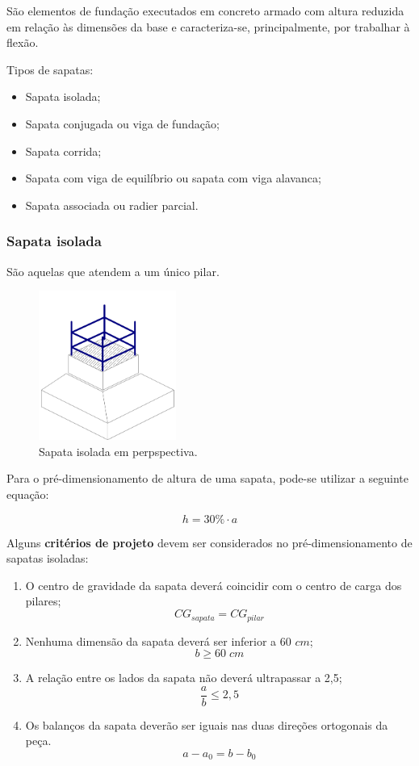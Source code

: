 São elementos de fundação executados em concreto armado com altura reduzida em relação às dimensões da base e caracteriza-se, principalmente, por trabalhar à flexão.

Tipos de sapatas:

\begin{itemize}
	\item Sapata isolada;
	\item Sapata conjugada ou viga de fundação;
	\item Sapata corrida;
	\item Sapata com viga de equilíbrio ou sapata com viga alavanca;
	\item Sapata associada ou radier parcial.
\end{itemize}

\subsubsection{Sapata isolada}

São aquelas que atendem a um único pilar.

\begin{figure}[htb]
	\begin{center}
	\caption{Sapata isolada em perpspectiva.}
    	\includegraphics[width=0.4\textwidth]{Fundacoes-rasas-ou-diretas/Imagens/Sapata-isolada-1.png}
	\end{center}
\end{figure}

Para o pré-dimensionamento de altura de uma sapata, pode-se utilizar a seguinte equação:

\begin{equation}
	h=30\%\cdot a
\end{equation}

Alguns \textbf{critérios de projeto} devem ser considerados no pré-dimensionamento de sapatas isoladas:

\begin{enumerate}
	\item O centro de gravidade da sapata deverá coincidir com o centro de carga dos pilares; $${CG}_{sapata}={CG}_{pilar}$$
	\item Nenhuma dimensão da sapata deverá ser inferior a 60 $cm$; $$b\geqslant60\;cm$$
	\item A relação entre os lados da sapata não deverá ultrapassar a 2,5; $$\frac{a}{b}\leqslant2,5$$
	\item Os balanços da sapata deverão ser iguais nas duas direções ortogonais da peça. $$a-a_0=b-b_0$$
\end{enumerate}

